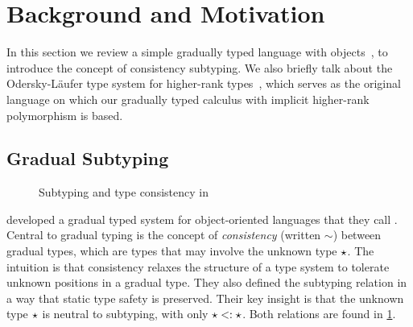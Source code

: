 \section{Background and Motivation}
\label{sec:background}

In this section we review a simple gradually typed language with
objects~\citep{siek2007gradual}, to introduce the concept of consistency
subtyping. We also briefly talk about the Odersky-L{\"a}ufer type system for
higher-rank types~\citep{odersky1996putting}, which serves as the original
language on which our gradually typed calculus with implicit 
higher-rank polymorphism is based.


\subsection{Gradual Subtyping}

\begin{figure}[t]
  \begin{small}

  \end{small}

  \caption{Subtyping and type consistency in \obb}
  \label{fig:objects}
\end{figure}

\citet{siek2007gradual} developed a gradual typed system for object-oriented
languages that they call \obb. Central to gradual typing is the concept of
\textit{consistency} (written $\sim$) between gradual types, which are types
that may involve the unknown type $\star$. The intuition is that consistency
relaxes the structure of a type system to tolerate unknown positions in a
gradual type. They also defined the subtyping relation in a way that static type
safety is preserved. Their key insight is that the unknown type $\star$ is
neutral to subtyping, with only $\star <: \star$. Both relations are
found in \cref{fig:objects}.

